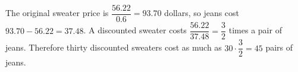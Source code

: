 The original sweater price is $\dfrac{56.22}{0.6}=93.70$ dollars, so jeans cost $93.70-56.22=37.48$. A discounted sweater costs $\dfrac{56.22}{37.48}=\dfrac{3}{2}$ times a pair of jeans. Therefore thirty discounted sweaters cost as much as $30\cdot\dfrac{3}{2}=\boxed{45}$ pairs of jeans.
